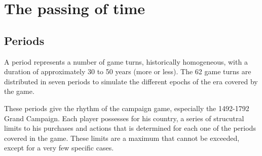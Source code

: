 



\section{The passing of time}
\subsection{Periods}
A period represents a number of game turns, historically homogeneous, with a
duration of approximately 30 to 50 years (more or less). The 62 game turns are
distributed in seven periods to simulate the different epochs of the era
covered by the game.

These periods give the rhythm of the campaign game, especially the 1492-1792
Grand Campaign. Each player possesses for his country, a series of strucutral
limits to his purchases and actions that is determined for each one of the
periods covered in the game. These limits are a maximum that cannot be
exceeded, except for a very few specific cases.



